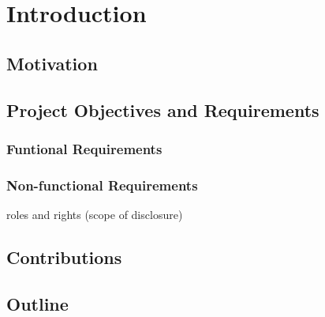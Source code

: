 \chapter{Introduction}

\section{Motivation}

\section{Project Objectives and Requirements}

\subsection{Funtional Requirements}\label{functionalRequirements}



\subsection{Non-functional Requirements}\label{nonfunctionalRequirements}

roles and rights (scope of disclosure)

\section{Contributions}

\section{Outline}